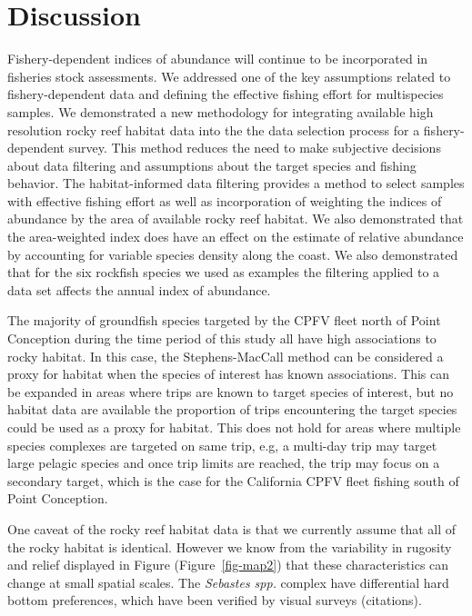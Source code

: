 \documentclass[
  12pt,
  authoryear,
  preprint,
  3p]{elsarticle}
\begin{document}
\hypertarget{discussion}{%
\section{Discussion}\label{discussion}}

Fishery-dependent indices of abundance will continue to be incorporated
in fisheries stock assessments. We addressed one of the key assumptions
related to fishery-dependent data and defining the effective fishing
effort for multispecies samples. We demonstrated a new methodology for
integrating available high resolution rocky reef habitat data into the
the data selection process for a fishery-dependent survey. This method
reduces the need to make subjective decisions about data filtering and
assumptions about the target species and fishing behavior. The
habitat-informed data filtering provides a method to select samples with
effective fishing effort as well as incorporation of weighting the
indices of abundance by the area of available rocky reef habitat. We
also demonstrated that the area-weighted index does have an effect on
the estimate of relative abundance by accounting for variable species
density along the coast. We also demonstrated that for the six rockfish
species we used as examples the filtering applied to a data set affects
the annual index of abundance.

The majority of groundfish species targeted by the CPFV fleet north of
Point Conception during the time period of this study all have high
associations to rocky habitat. In this case, the Stephens-MacCall method
can be considered a proxy for habitat when the species of interest has
known associations. This can be expanded in areas where trips are known
to target species of interest, but no habitat data are available the
proportion of trips encountering the target species could be used as a
proxy for habitat. This does not hold for areas where multiple species
complexes are targeted on same trip, e.g, a multi-day trip may target
large pelagic species and once trip limits are reached, the trip may
focus on a secondary target, which is the case for the California CPFV
fleet fishing south of Point Conception.

One caveat of the rocky reef habitat data is that we currently assume
that all of the rocky habitat is identical. However we know from the
variability in rugosity and relief displayed in Figure
(Figure~\ref{fig-map2}) that these characteristics can change at small
spatial scales. The \emph{Sebastes spp.} complex have differential hard
bottom preferences, which have been verified by visual surveys
(citations).
\end{document}
